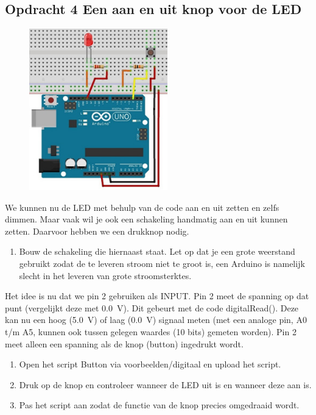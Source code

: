 \documentclass{arduino}
\begin{document}
\subsection{Opdracht 4 Een aan en uit knop voor de LED}

\begin{figure}
\raggedleft
\includegraphics[width=6cm]{15. Circuit LED button}
\end{figure}

We kunnen nu de LED met behulp van de code aan en uit zetten en zelfs dimmen. Maar vaak wil je ook een schakeling handmatig aan en uit kunnen zetten. Daarvoor hebben we een drukknop nodig.

\begin{enumerate}[label={\alph*})]
\item Bouw de schakeling die hiernaast staat. Let op dat je een grote weerstand gebruikt zodat de te leveren stroom niet te groot is, een Arduino is namelijk slecht in het leveren van grote stroomsterktes.
\end{enumerate}

Het idee is nu dat we pin 2 gebruiken als INPUT. Pin 2 meet de spanning op dat punt (vergelijkt deze met \SI{0.0}{\volt}). Dit gebeurt met de code digitalRead(). Deze kan nu een hoog (\SI{5.0}{\volt}) of laag (\SI{0.0}{\volt}) signaal meten (met een analoge pin, A0 t/m A5, kunnen ook tussen gelegen waardes (10 bits) gemeten worden). Pin 2 meet alleen een spanning als de knop (button) ingedrukt wordt.

\begin{enumerate}[label={\alph*})]
\item Open het script Button via voorbeelden/digitaal en upload het script.

\item Druk op de knop en controleer wanneer de LED uit is en wanneer deze aan is.

\item Pas het script aan zodat de functie van de knop precies omgedraaid wordt.
\end{enumerate}
\end{document}
